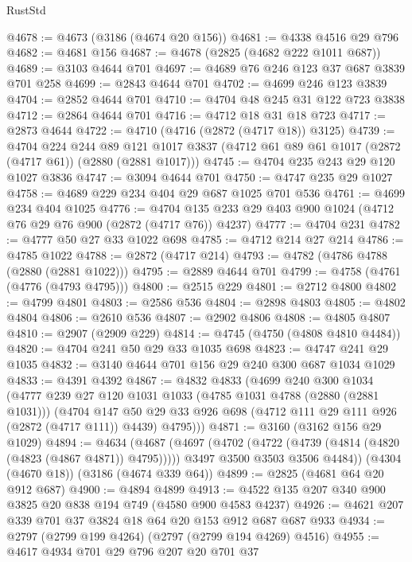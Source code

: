 \begin{lexlean}{RustStd}
\begin{coremodule}
@4678 := @4673 (@3186 (@4674 @20 @156))
@4681 := @4338 @4516 @29 @796
@4682 := @4681 @156
@4687 := @4678 (@2825 (@4682 @222 @1011 @687))
@4689 := @3103 @4644 @701
@4697 := @4689 @76 @246 @123 @37 @687 @3839 @701 @258
@4699 := @2843 @4644 @701
@4702 := @4699 @246 @123 @3839
@4704 := @2852 @4644 @701
@4710 := @4704 @48 @245 @31 @122 @723 @3838
@4712 := @2864 @4644 @701
@4716 := @4712 @18 @31 @18 @723
@4717 := @2873 @4644
@4722 := @4710 (@4716 (@2872 (@4717 @18)) @3125)
@4739 := @4704
    @224
    @244
    @89
    @121
    @1017
    @3837
    (@4712 @61 @89 @61 @1017 (@2872 (@4717 @61)) (@2880 (@2881 @1017)))
@4745 := @4704 @235 @243 @29 @120 @1027 @3836
@4747 := @3094 @4644 @701
@4750 := @4747 @235 @29 @1027
@4758 := @4689 @229 @234 @404 @29 @687 @1025 @701 @536
@4761 := @4699 @234 @404 @1025
@4776 := @4704 @135 @233 @29 @403 @900 @1024 (@4712 @76 @29 @76 @900 (@2872 (@4717 @76)) @4237)
@4777 := @4704 @231
@4782 := @4777 @50 @27 @33 @1022 @698
@4785 := @4712 @214 @27 @214
@4786 := @4785 @1022
@4788 := @2872 (@4717 @214)
@4793 := @4782 (@4786 @4788 (@2880 (@2881 @1022)))
@4795 := @2889 @4644 @701
@4799 := @4758 (@4761 (@4776 (@4793 @4795)))
@4800 := @2515 @229
@4801 := @2712 @4800
@4802 := @4799 @4801
@4803 := @2586 @536
@4804 := @2898 @4803
@4805 := @4802 @4804
@4806 := @2610 @536
@4807 := @2902 @4806
@4808 := @4805 @4807
@4810 := @2907 (@2909 @229)
@4814 := @4745 (@4750 (@4808 @4810 @4484))
@4820 := @4704 @241 @50 @29 @33 @1035 @698
@4823 := @4747 @241 @29 @1035
@4832 := @3140 @4644 @701 @156 @29 @240 @300 @687 @1034 @1029
@4833 := @4391 @4392
@4867 := @4832
    @4833
    (@4699
      @240
      @300
      @1034
      (@4777
        @239
        @27
        @120
        @1031
        @1033
        (@4785 @1031 @4788 (@2880 (@2881 @1031)))
        (@4704
          @147
          @50
          @29
          @33
          @926
          @698
          (@4712 @111 @29 @111 @926 (@2872 (@4717 @111)) @4439)
          @4795)))
@4871 := @3160 (@3162 @156 @29 @1029)
@4894 := @4634
    (@4687
      (@4697
        (@4702 (@4722 (@4739 (@4814 (@4820 (@4823 (@4867 @4871)) @4795)))))
        @3497
        @3500
        @3503
        @3506
        @4484))
    (@4304 (@4670 @18))
    (@3186 (@4674 @339 @64))
@4899 := @2825 (@4681 @64 @20 @912 @687)
@4900 := @4894 @4899
@4913 := @4522 @135 @207 @340 @900 @3825 @20 @838 @194 @749 (@4580 @900 @4583 @4237)
@4926 := @4621 @207 @339 @701 @37 @3824 @18 @64 @20 @153 @912 @687 @687 @933
@4934 := @2797 (@2799 @199 @4264) (@2797 (@2799 @194 @4269) @4516)
@4955 := @4617
    @4934
    @701
    @29
    @796
    @207
    @20
    @701
    @37

\end{coremodule}
\end{lexlean}
